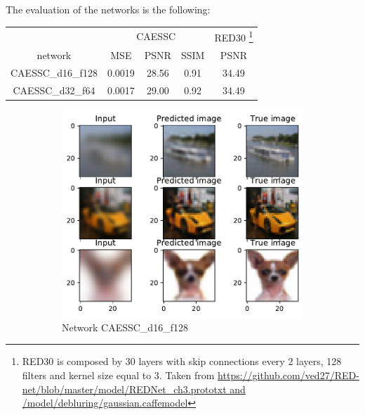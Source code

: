 The evaluation of the networks is the following:

\begin{tabularx}{300pt}{ccccc}
    & \multicolumn{3}{c}{CAESSC} & {RED30} \footnote{RED30 is composed by 30 layers with skip connections every 2 layers, 128 filters and kernel size equal to 3. Taken from \url{https://github.com/ved27/RED-net/blob/master/model/REDNet_ch3.prototxt and /model/debluring/gaussian.caffemodel}} \\
    network & MSE & PSNR & SSIM & PSNR  \\
    CAESSC\_d16\_f128 & 0.0019 & 28.56 & 0.91 & 34.49 \\
    CAESSC\_d32\_f64 & 0.0017 & 29.00 & 0.92 & 34.49
\end{tabularx}


\begin{figure}[H]
    \centering
    \begin{subfigure}{\textwidth}
        \centering
        \includegraphics[height=0.35\textheight,keepaspectratio]{subsections/caessc/d16_f128.pdf}
        \caption{Network CAESSC\_d16\_f128}    
    \end{subfigure}
    \begin{subfigure}{\textwidth}
        \centering

\end{subfigure}
\end{figure}
